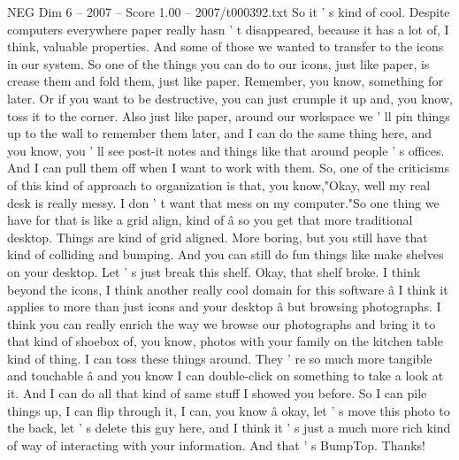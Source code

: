 \begin{textsample}{NEG Dim 6 – 2007 – Score 1.00 – 2007/t000392.txt}
So it ' s kind of cool.
Despite computers everywhere paper really hasn ' t disappeared, because it has a lot of, I think, valuable properties.
And some of those we wanted to transfer to the icons in our system.
So one of the things you can do to our icons, just like paper, is crease them and fold them, just like paper.
Remember, you know, something for later.
Or if you want to be destructive, you can just crumple it up and, you know, toss it to the corner.
Also just like paper, around our workspace we ' ll pin things up to the wall to remember them later, and I can do the same thing here, and you know, you ' ll see post-it notes and things like that around people ' s offices.
And I can pull them off when I want to work with them.
So, one of the criticisms of this kind of approach to organization is that, you know,"Okay, well my real desk is really messy.
I don ' t want that mess on my computer."So one thing we have for that is like a grid align, kind of â so you get that more traditional desktop.
Things are kind of grid aligned.
More boring, but you still have that kind of colliding and bumping.
And you can still do fun things like make shelves on your desktop.
Let ' s just break this shelf.
Okay, that shelf broke.
I think beyond the icons, I think another really cool domain for this software â I think it applies to more than just icons and your desktop â but browsing photographs.
I think you can really enrich the way we browse our photographs and bring it to that kind of shoebox of, you know, photos with your family on the kitchen table kind of thing.
I can toss these things around.
They ' re so much more tangible and touchable â and you know I can double-click on something to take a look at it.
And I can do all that kind of same stuff I showed you before.
So I can pile things up, I can flip through it, I can, you know â okay, let ' s move this photo to the back, let ' s delete this guy here, and I think it ' s just a much more rich kind of way of interacting with your information.
And that ' s BumpTop.
Thanks!

\end{textsample}
